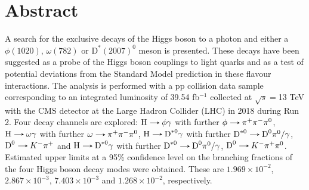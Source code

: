 \thispagestyle{empty}
\makeatletter
\@openrightfalse
\makeatother
\chapter*{Abstract}

\vspace*{-0.2cm}

A search for the exclusive decays of the Higgs boson to a photon and either a $\phi(1020)$, $\omega(782)$ or $\text{D}^{*}(2007)^{0}$ meson is presented. These decays have been suggested as a probe of the Higgs boson couplings to light quarks and as a test of potential deviations from the Standard Model prediction in these flavour interactions. The analysis is performed with a pp collision data sample corresponding to an integrated luminosity of 39.54 fb$^{-1}$ collected at $\sqrt{s}=$13 TeV with the CMS detector at the Large Hadron Collider (LHC) in 2018 during Run 2. Four decay channels are explored: $\text{H}\decaysto \phi\gamma$ with further $\phi\decaysto \pi^+\pi^-\pi^0$, $\text{H}\decaysto \omega\gamma$ with further $\omega\decaysto \pi^+\pi^-\pi^0$, $\text{H}\decaysto \text{D}^{*0}\gamma$ with further $\text{D}^{*0}\decaysto \text{D}^{0}\pi^{0}/\gamma$, $\text{D}^{0}\decaysto K^{-}\pi^{+}$ and $\text{H}\decaysto \text{D}^{*0}\gamma$ with further $\text{D}^{*0}\decaysto \text{D}^{0}\pi^{0}/\gamma$, $\text{D}^{0}\decaysto K^{-}\pi^{+}\pi^{0}$. Estimated upper limits at a 95\% confidence level on the branching fractions of the four Higgs boson decay modes were obtained. These are $1.969 \times 10^{-2}$, $2.867 \times 10^{-3}$, $7.403 \times 10^{-3}$ and $1.268 \times 10^{-2}$, respectively.

\vspace*{1.5cm}

